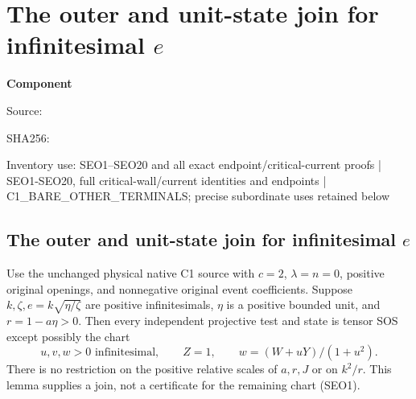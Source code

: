 \chapter{The outer and unit-state join for infinitesimal $e$}
\label{component:p05a86be0046c}
\noindent\textbf{Component }\par
{\small\noindent Source: \par}
{\small\noindent SHA256: \par}
{\small\noindent Inventory use: SEO1--SEO20 and all exact endpoint/critical-current proofs | SEO1-SEO20, full critical-wall/current identities and endpoints | C1\_\allowbreak{}BARE\_\allowbreak{}OTHER\_\allowbreak{}TERMINALS; precise subordinate uses retained below\par}
\medskip
\section[The outer and unit-state join for infinitesimal e]{The outer and unit-state join for infinitesimal $e$}
\label{p05a86be0046c:sec:small-e-outer}

\begin{lemma}
Use the unchanged physical native C1 source with $c=2$,
$\lambda=n=0$, positive original openings, and nonnegative original
event coefficients. Suppose $k,\zeta,e=k\sqrt{\eta/\zeta}$ are positive
infinitesimals, $\eta$ is a positive bounded unit, and
$r=1-a\eta>0$. Then every independent projective test and state is
tensor SOS except possibly the chart
\[
 u,v,w>0\text{ infinitesimal},\qquad Z=1,
 \qquad w=(W+uY)/(1+u^2).
 \tag{SEO1}
\]
There is no restriction on the positive relative scales of $a,r,J$
or on $k^2/r$. This lemma supplies a join, not a certificate for the
remaining chart (SEO1).
\end{lemma}

